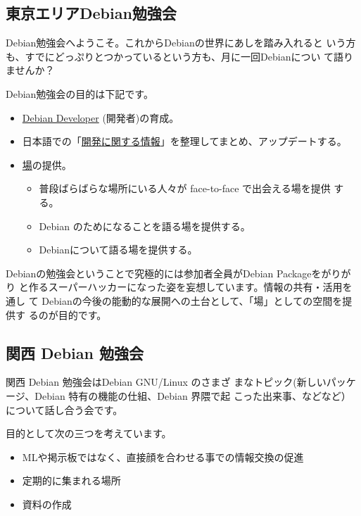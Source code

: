 \documentclass[mingoth,a4paper]{jsarticle}
\begin{document}

\subsection{東京エリアDebian勉強会}

 Debian勉強会へようこそ。これからDebianの世界にあしを踏み入れると
 いう方も、すでにどっぷりとつかっているという方も、月に一回Debianについ
 て語りませんか？

 Debian勉強会の目的は下記です。

\begin{itemize}
 \item \underline{Debian Developer} (開発者)の育成。
 \item 日本語での「\underline{開発に関する情報}」を整理してまとめ、アップデートする。
 \item \underline{場}の提供。
 \begin{itemize}
  \item 普段ばらばらな場所にいる人々が face-to-face で出会える場を提供
	する。
  \item Debian のためになることを語る場を提供する。
  \item Debianについて語る場を提供する。
 \end{itemize}
\end{itemize}		

 Debianの勉強会ということで究極的には参加者全員がDebian Packageをがりがり
 と作るスーパーハッカーになった姿を妄想しています。情報の共有・活用を通し
 て Debianの今後の能動的な展開への土台として、「場」としての空間を提供す
 るのが目的です。

\subsection{関西 Debian 勉強会}

 関西 Debian 勉強会はDebian GNU/Linux のさまざ
 まなトピック(新しいパッケージ、Debian 特有の機能の仕組、Debian 界隈で起
 こった出来事、などなど）について話し合う会です。

 目的として次の三つを考えています。
 \begin{itemize}
  \item MLや掲示板ではなく、直接顔を合わせる事での情報交換の促進
  \item 定期的に集まれる場所
  \item 資料の作成
 \end{itemize}
\end{document}
